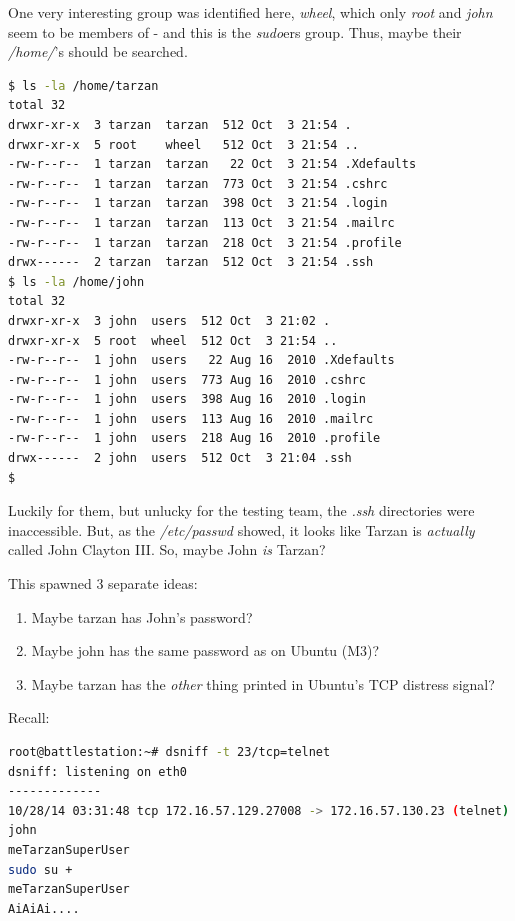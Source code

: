 One very interesting group was identified here, \textit{wheel}, which only \textit{root} and \textit{john} seem to be members of - and this is the \textit{sudo}ers group. Thus, maybe their \textit{/home/}'s should be searched.

\begin{lstlisting}[language=bash,caption={Searching through John's and Tarzan's /home/}]
$ ls -la /home/tarzan
total 32
drwxr-xr-x  3 tarzan  tarzan  512 Oct  3 21:54 .
drwxr-xr-x  5 root    wheel   512 Oct  3 21:54 ..
-rw-r--r--  1 tarzan  tarzan   22 Oct  3 21:54 .Xdefaults
-rw-r--r--  1 tarzan  tarzan  773 Oct  3 21:54 .cshrc
-rw-r--r--  1 tarzan  tarzan  398 Oct  3 21:54 .login
-rw-r--r--  1 tarzan  tarzan  113 Oct  3 21:54 .mailrc
-rw-r--r--  1 tarzan  tarzan  218 Oct  3 21:54 .profile
drwx------  2 tarzan  tarzan  512 Oct  3 21:54 .ssh
$ ls -la /home/john
total 32
drwxr-xr-x  3 john  users  512 Oct  3 21:02 .
drwxr-xr-x  5 root  wheel  512 Oct  3 21:54 ..
-rw-r--r--  1 john  users   22 Aug 16  2010 .Xdefaults
-rw-r--r--  1 john  users  773 Aug 16  2010 .cshrc
-rw-r--r--  1 john  users  398 Aug 16  2010 .login
-rw-r--r--  1 john  users  113 Aug 16  2010 .mailrc
-rw-r--r--  1 john  users  218 Aug 16  2010 .profile
drwx------  2 john  users  512 Oct  3 21:04 .ssh
$
\end{lstlisting}

Luckily for them, but unlucky for the testing team, the \textit{.ssh} directories were inaccessible. But, as the \textit{/etc/passwd} showed, it looks like Tarzan is \textit{actually} called John Clayton III. So, maybe John \textit{is} Tarzan?

This spawned 3 separate ideas:

\begin{enumerate}
	\item Maybe tarzan has John's password?
	\item Maybe john has the same password as on Ubuntu (M3)?
	\item Maybe tarzan has the \textit{other} thing printed in Ubuntu's TCP distress signal?
\end{enumerate}

Recall:
\begin{lstlisting}[language=bash,caption={Flashback to dsniff}]
root@battlestation:~# dsniff -t 23/tcp=telnet
dsniff: listening on eth0
-------------
10/28/14 03:31:48 tcp 172.16.57.129.27008 -> 172.16.57.130.23 (telnet)
john
meTarzanSuperUser
sudo su +
meTarzanSuperUser
AiAiAi....
\end{lstlisting}

